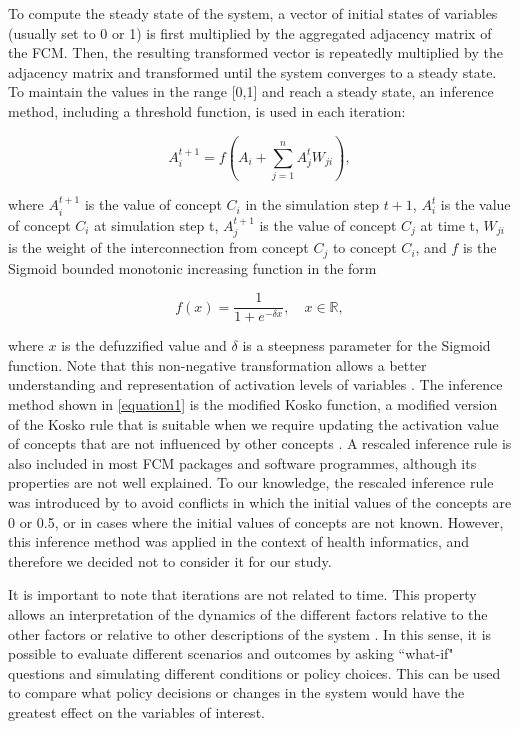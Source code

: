 \begin{appendices}
To compute the steady state of the system, a vector of initial states of variables (usually set to 0 or 1) is first multiplied by the aggregated adjacency matrix of the FCM. Then, the resulting transformed vector is repeatedly multiplied by the adjacency matrix and transformed until the system converges to a steady state. To maintain the values in the range [0,1] and reach a steady state, an inference method, including a threshold function, is used in each iteration:

\begin{equation}
\label{equation1} 
A_i^{t+1} = f \left( A_i + \sum_{j=1}^{n} A_j^t W_{ji} \right), 
\end{equation}

where $A_i^{t+1}$ is the value of concept $C_i$ in the simulation step $t+1$, $A_i^{t}$ is the value of concept $C_i$ at simulation step t, $A_j^{t+1}$ is the value of concept $C_j$ at time t, $W_{ji}$ is the weight of the interconnection from concept $C_j$ to concept $C_i$, and $f$ is the Sigmoid bounded monotonic increasing function in the form

\begin{equation}
\label{equation2}  
f(x) = \frac{1}{1+e^{-\delta x}}, \quad  x \in \mathbb{R}, 
\end{equation}

where $x$ is the defuzzified value and $\delta$ is a steepness parameter for the Sigmoid function. Note that this non-negative transformation allows a better understanding and representation of activation levels of variables \citep{ozesmi2004ecological}. The inference method shown in \cref{equation1} is the modified Kosko function, a modified version of the Kosko rule that is suitable when we require updating the activation value of concepts that are not influenced by other concepts \citep{sujamol2018study}. A rescaled inference rule is also included in most FCM packages and software programmes, although its properties are not well explained. To our knowledge, the rescaled inference rule was introduced by \cite{papageorgiou2011new} to avoid conflicts in which the initial values of the concepts are 0 or 0.5, or in cases where the initial values of concepts are not known. However, this inference method was applied in the context of health informatics, and therefore we decided not to consider it for our study. 

It is important to note that iterations are not related to time. This property allows an interpretation of the dynamics of the different factors relative to the other factors or relative to other descriptions of the system \citep{edwards2021building, diniz2015mapping}. In this sense, it is possible to evaluate different scenarios and outcomes by asking ``what-if" questions and simulating different conditions or policy choices. This can be used to compare what policy decisions or changes in the system would have the greatest effect on the variables of interest.




\end{appendices}
